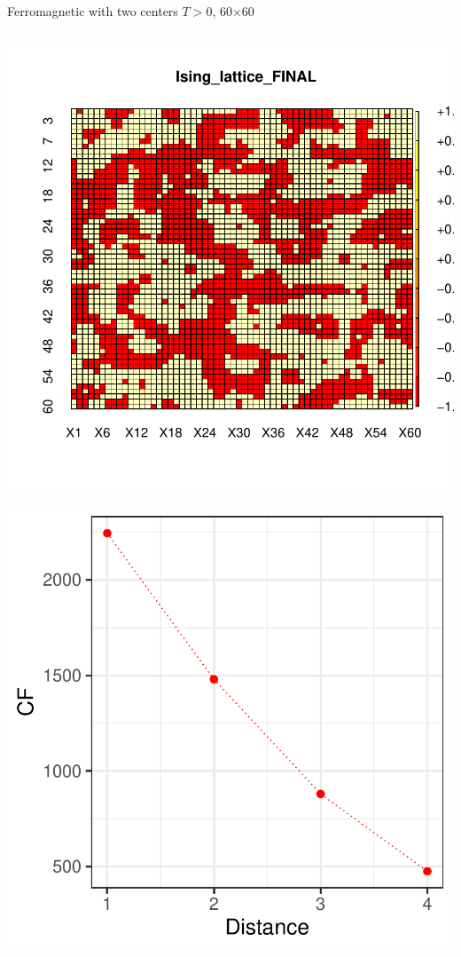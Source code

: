 \documentclass{beamer}
\begin{document}
\begin{frame}{Ferromagnetic with two centers $T>0$,  60$\times$60}
\begin{columns}
\begin{column}{0.3\textwidth}
    \begin{center}
     \includegraphics[width=\textwidth]{Pic/J+1_60_10000_T=1_FINAL.pdf}
     \end{center}
         \begin{center}
     \includegraphics[width=\textwidth]{Pic/J+1_60_10000_T=1_FINAL_COHERENCE.pdf}

\end{center}
\end{column}
\end{columns}
\end{frame}
\end{document}
